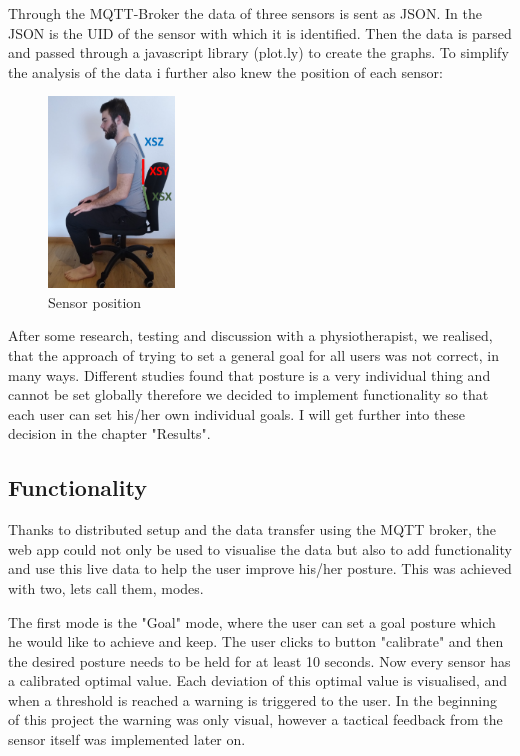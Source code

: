 Through the MQTT-Broker the data of three sensors is sent as JSON. In the JSON is the UID of the sensor with which it is identified. Then the data is parsed and passed through a javascript library (plot.ly) \cite{ModernAn18:online} to create the graphs. To simplify the analysis of the data i further also knew the position of each sensor:

\begin{figure}[ht]
  \begin{center}
\includegraphics[width=0.3\textwidth]{images/ChairVisualised.png}
  \end{center}
  \caption{Sensor position}
  \label{fig:SensorPos}
\end{figure}

After some research, testing and discussion with a physiotherapist, we realised, that the approach of trying to set a general goal for all users was not correct, in many ways. Different studies found that posture is a very individual thing and cannot be set globally \cite{SitUpSt77:online} therefore we decided to implement functionality so that each user can set his/her own individual goals. I will get further into these decision in the chapter "Results".

\subsection{Functionality}

Thanks to distributed setup and the data transfer using the MQTT broker, the web app could not only be used to visualise the data but also to add functionality and use this live data to help the user improve his/her posture. This was achieved with two, lets call them, modes. 

The first mode is the "Goal" mode, where the user can set a goal posture which he would like to achieve and keep. The user clicks to button "calibrate" and then the desired posture needs to be held for at least 10 seconds. 
Now every sensor has a calibrated optimal value. Each deviation of this optimal value is visualised, and when a threshold is reached a warning is triggered to the user. In the beginning of this project the warning was only visual, however a tactical feedback from the sensor itself was implemented later on.

